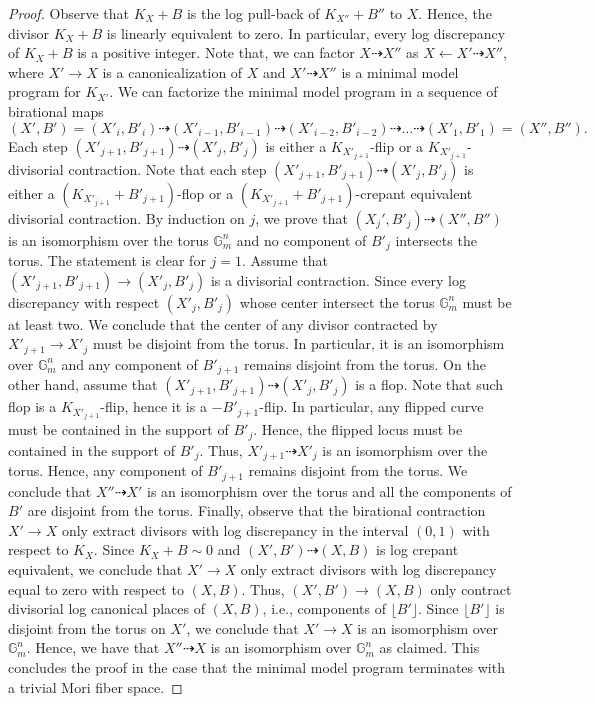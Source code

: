 \documentclass{amsart}
\theoremstyle{remark}
\numberwithin{equation}{section}
\begin{document}
\begin{proof}
Observe that $K_X+B$ is the log pull-back of $K_{X''}+B''$ to $X$.
Hence, the divisor $K_X+B$ is linearly equivalent to zero.
In particular, every log discrepancy of $K_{X}+B$ is 
a positive integer.
Note that, we can factor $X\dashrightarrow X''$ as
$X \leftarrow X' \dashrightarrow X''$, where
$X'\rightarrow X$ is a canonicalization of $X$ and
$X'\dashrightarrow X''$ is a minimal model program for $K_{X'}$.
We can factorize the minimal model program in a sequence
of birational maps
\[
(X',B')=(X'_i,B'_i) \dashrightarrow
(X'_{i-1},B'_{i-1})\dashrightarrow
(X'_{i-2},B'_{i-2})\dashrightarrow \dots
\dashrightarrow 
(X'_1,B'_1)=(X'',B'').
\]
Each step
$(X'_{j+1},B'_{j+1})\dashrightarrow (X'_j,B'_j)$ is either
a $K_{X'_{j+1}}$-flip or a $K_{X'_{j+1}}$-divisorial contraction.
Note that each step
$(X'_{j+1},B'_{j+1})\dashrightarrow (X'_j,B'_j)$
is either a
$(K_{X'_{j+1}}+B'_{j+1})$-flop
or a 
$(K_{X'_{j+1}}+B'_{j+1})$-crepant equivalent  divisorial contraction.
By induction on $j$, we prove that 
$(X_j',B'_j)\dashrightarrow (X'',B'')$ is an isomorphism over
the torus $\mathbb{G}_m^n$
and no component of $B'_j$ intersects the torus.
The statement is clear for $j=1$.
Assume that $(X'_{j+1},B'_{j+1})\rightarrow (X'_j,B'_j)$ is a divisorial contraction. 
Since every log discrepancy with respect $(X'_j,B'_j)$ whose center
intersect the torus $\mathbb{G}_m^n$
must be at least two. We conclude that 
the center of any divisor contracted by
$X'_{j+1}\rightarrow X'_j$ must be disjoint from the torus.
In particular, 
it is an isomorphism over $\mathbb{G}_m^n$ and
any component of $B'_{j+1}$ remains disjoint
from the torus.
On the other hand,
assume that $(X'_{j+1},B'_{j+1}) \dashrightarrow (X'_j,B'_j)$ is a flop.
Note that such flop is a $K_{X'_{j+1}}$-flip, 
hence it is a $-B'_{j+1}$-flip.
In particular, any flipped curve must be contained in the support
of $B'_j$.
Hence, the flipped locus must be contained in the support of $B'_j$.
Thus, $X'_{j+1}\dashrightarrow X'_j$ is an isomorphism over the torus. Hence, any component of $B'_{j+1}$ remains disjoint 
from the torus.
We conclude that $X''\dashrightarrow X'$ is an isomorphism over the torus
and all the components of $B'$ are disjoint from the torus.
Finally, observe that the birational contraction
$X'\rightarrow X$ only extract divisors with log discrepancy
in the interval $(0,1)$ with respect to $K_X$.
Since $K_X+B\sim 0$ and
$(X',B')\dashrightarrow (X,B)$ is log crepant equivalent, 
we conclude that $X'\rightarrow X$ only extract divisors 
with log discrepancy equal to zero with respect to $(X,B)$.
Thus, $(X',B')\rightarrow (X,B)$ only contract divisorial log canonical places of $(X,B)$, i.e., components of $\lfloor B'\rfloor$.
Since $\lfloor B'\rfloor$ is disjoint from the torus on $X'$,
we conclude that $X'\rightarrow X$ is an isomorphism over $\mathbb{G}_m^n$.
Hence, we have that 
$X''\dashrightarrow X$ is an isomorphism over $\mathbb{G}_m^n$ as claimed.
This concludes the proof in the case that the minimal model program terminates with a trivial Mori fiber space.


\end{proof}
\end{document}

